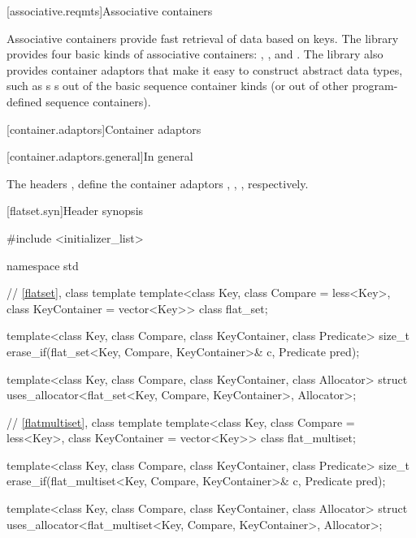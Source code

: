 \noindent\makebox[\linewidth]{\rule{\textwidth}{0.4pt}}

\setcounter{subsection}{5}
[associative.reqmts]{Associative containers}

\pnum
Associative containers provide fast retrieval of data based on keys.
The library provides four basic kinds of associative containers:
,
,
and
. The library also provides container adaptors that
make it easy to construct abstract data types, such as s
s out of
the basic sequence container kinds (or out of other program-defined sequence
containers).

\noindent\makebox[\linewidth]{\rule{\textwidth}{0.4pt}}

\setcounter{chapter}{24}
\setcounter{section}{5}
[container.adaptors]{Container adaptors}

[container.adaptors.general]{In general}

\pnum
The headers , 
 define the container adaptors
, , 
, respectively.

\noindent\makebox[\linewidth]{\rule{\textwidth}{0.4pt}}

\setcounter{subsection}{3}
\begin{addedblock}
[flatset.syn]{Header  synopsis}%
%

\begin{codeblock}
#include <initializer_list>

namespace std {
  // \ref{flatset}, class template 
  template<class Key, class Compare = less<Key>, class KeyContainer = vector<Key>>
    class flat_set;

  template<class Key, class Compare, class KeyContainer, class Predicate>
    size_t erase_if(flat_set<Key, Compare, KeyContainer>& c, Predicate pred);

  template<class Key, class Compare, class KeyContainer, class Allocator>
    struct uses_allocator<flat_set<Key, Compare, KeyContainer>, Allocator>;

  // \ref{flatmultiset}, class template 
  template<class Key, class Compare = less<Key>, class KeyContainer = vector<Key>>
    class flat_multiset;

  template<class Key, class Compare, class KeyContainer, class Predicate>
    size_t erase_if(flat_multiset<Key, Compare, KeyContainer>& c, Predicate pred);

  template<class Key, class Compare, class KeyContainer, class Allocator>
    struct uses_allocator<flat_multiset<Key, Compare, KeyContainer>, Allocator>;
}
\end{codeblock}
\end{addedblock}

